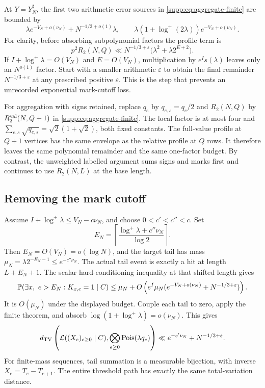 At $Y=Y_N^\sharp$, the first two arithmetic error sources in
\eqref{supp:eq:aggregate-finite} are bounded by
\[
 \lambda e^{-V_N+o(\nu_N)}+N^{-1/2+o(1)}\lambda,
 \qquad
 \lambda(1+\log^+(2\lambda))e^{-V_N+o(\nu_N)}.
\]
For clarity, before absorbing subpolynomial factors the profile term is
\[
 p^2R_2(N,Q)
 \ll N^{-1/3+\varepsilon}
              \bigl(\lambda^2+\lambda 2^{E+2}\bigr).
\]
If $I+\log^+\lambda=O(V_N)$ and $E=O(V_N)$, multiplication by
$e^Is(\lambda)$ leaves only an $N^{o(1)}$ factor. Start with a smaller
arithmetic $\varepsilon$ to obtain the final remainder
$N^{-1/3+\varepsilon}$ at any prescribed positive $\varepsilon$.
This is the step that prevents an unrecorded exponential mark-cutoff loss.


For aggregation with signs retained, replace $q_e$ by
$q_{e,s}=q_e/2$ and $R_2(N,Q)$ by $R^{\rm val}_2(N,Q+1)$ in
\eqref{supp:eq:aggregate-finite}. The local factor is at most four and
$\sum_{e,s}\sqrt{q_{e,s}}=\sqrt2(1+\sqrt2)$, both fixed constants.
The full-value profile at $Q+1$ vertices has the same envelope as the
relative profile at $Q$ rows. It therefore leaves the same polynomial
remainder and the same one-factor budget. By contrast, the unweighted
labelled argument sums signs and marks first and continues to use
$R_2(N,L)$ at the base length.

\subsection{Removing the mark cutoff}
Assume $I+\log^+\lambda\le V_N-c\nu_N$, and choose
$0<c'<c''<c$. Set
\[
 E_N=\left\lceil
        \frac{\log^+\lambda+c''\nu_N}{\log2}\right\rceil .
\]
Then $E_N=O(V_N)=o(\log N)$, and the target tail has mass
$\mu_N=\lambda2^{-E_N-1}\le e^{-c''\nu_N}$.
The actual tail event is exactly a hit at length $L+E_N+1$.
The scalar hard-conditioning inequality at that shifted length gives
\[
 \mathbb P(\exists x,\ e>E_N:K_{x,e}=1\mid C)
 \le \mu_N+
 O\left(e^I\mu_N
      (e^{-V_N+o(\nu_N)}+N^{-1/3+\varepsilon})\right).
\]
It is $O(\mu_N)$ under the displayed budget. Couple each tail to zero,
apply the finite theorem, and absorb
$\log(1+\log^+\lambda)=o(\nu_N)$. This gives
\[
 d_{\mathrm{TV}}\left(\mathcal L((X_e)_{e\ge0}\mid C),
                  \bigotimes_{e\ge0}\operatorname{Pois}(\lambda q_e)\right)
 \ll e^{-c'\nu_N}+N^{-1/3+\varepsilon}.
\]
For finite-mass sequences, tail summation is a measurable bijection,
with inverse $X_e=T_e-T_{e+1}$. The entire threshold path has exactly the
same total-variation distance.

